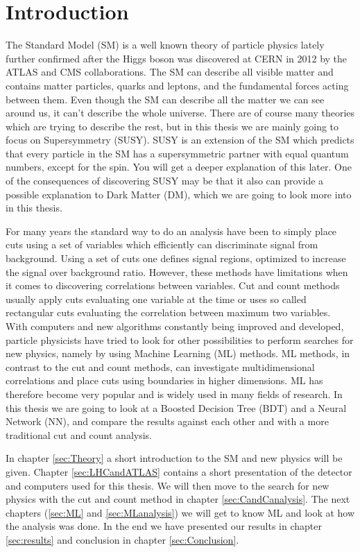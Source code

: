 \chapter*{Introduction}
\label{sec:Introduction}
The Standard Model (SM) \cite{thomson} is a well known theory of particle physics lately further confirmed after the Higgs boson was discovered at CERN in 2012 by the ATLAS \cite{Higgs_ATLAS} and CMS \cite{Higgs_CMS} collaborations. The SM can describe all visible matter and contains matter particles, quarks and leptons, and the fundamental forces acting between them. Even though the SM can describe all the matter we can see around us, it can't describe the whole universe. There are of course many theories which are trying to describe the rest, but in this thesis we are mainly going to focus on Supersymmetry (SUSY). SUSY is an extension of the SM which predicts that every particle in the SM has a supersymmetric partner with equal quantum numbers, except for the spin. You will get a deeper explanation of this later. One of the consequences of discovering SUSY may be that it also can provide a possible explanation to Dark Matter (DM), which we are going to look more into in this thesis.

For many years the standard way to do an analysis have been to simply place cuts using a set of variables which efficiently can discriminate signal from background. Using a set of cuts one defines signal regions, optimized to increase the signal over background ratio. However, these methods have limitations when it comes to discovering correlations between variables. Cut and count methods usually apply cuts evaluating one variable at the time or uses so called rectangular cuts evaluating the correlation between maximum two variables. With computers and new algorithms constantly being improved and developed, particle physicists have tried to look for other possibilities to perform searches for new physics, namely by using Machine Learning (ML) methods. ML methods, in contrast to the cut and count methods, can investigate multidimensional correlations and place cuts using boundaries in higher dimensions. ML has therefore become very popular and is widely used in many fields of research. In this thesis we are going to look at a Boosted Decision Tree (BDT) and a Neural Network (NN), and compare the results against each other and with a more traditional cut and count analysis. 

In chapter \ref{sec:Theory} a short introduction to the SM and new physics will be given. Chapter \ref{sec:LHCandATLAS} contains a short presentation of the detector and computers used for this thesis. We will then move to the search for new physics with the cut and count method in chapter \ref{sec:CandCanalysis}. The next chapters (\ref{sec:ML} and \ref{sec:MLanalysis}) we will get to know ML and look at how the analysis was done. In the end we have presented our results in chapter \ref{sec:results} and conclusion in chapter \ref{sec:Conclusion}.


